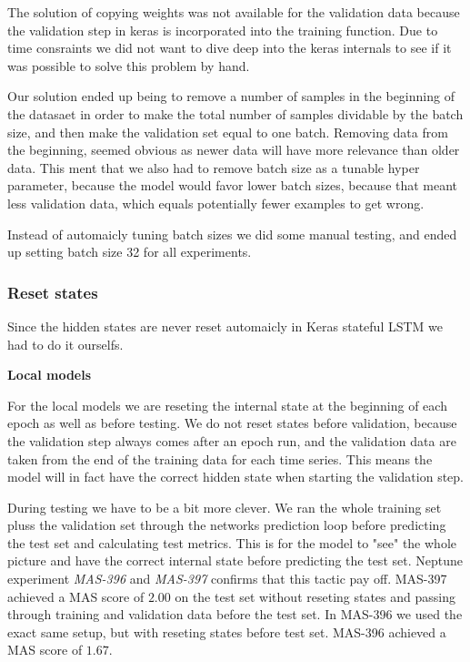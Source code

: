 The solution of copying weights was not available for the validation data
because the validation step in keras is incorporated into the training function.
Due to time consraints we did not want to dive deep into the keras internals
to see if it was possible to solve this problem by hand.

Our solution ended up being to remove a number of samples in the beginning of
the datasaet in order to make the total number of samples dividable by the batch size,
and then make the validation set equal to one batch. Removing data from the beginning,
seemed obvious as newer data will have more relevance than older data.
This ment that we also had to remove batch size as a tunable hyper parameter,
because the model would favor lower batch sizes, because that meant less validation data,
which equals potentially fewer examples to get wrong.

Instead of automaicly tuning batch sizes we did some manual testing, and
ended up setting batch size 32 for all experiments.


\subsubsection{Reset states}
Since  the hidden states are never reset automaicly in Keras stateful LSTM
we had to do it ourselfs.

\textbf{Local models}

For the local models we are reseting the internal state at the beginning
of each epoch as well as before testing. We do not reset states before validation,
because the validation step always comes after an epoch run, and the
validation data are taken from the end of the training data for each time series.
This means the model will in fact have the correct hidden state when starting the validation step.

During testing we have to be a bit more clever. We ran the whole training set pluss
the validation set through the networks prediction loop before predicting the test
set and calculating test metrics.
This is for the model to "see" the whole picture and have the correct
internal state before predicting the test set.
Neptune experiment \textit{MAS-396} and \textit{MAS-397} confirms
that this tactic pay off. MAS-397 achieved a MAS score of $2.00$ on the test set
without reseting states and passing through training and validation data before
the test set. In MAS-396 we used the exact same setup, but with reseting states
before test set. MAS-396 achieved a MAS score of $1.67$.

